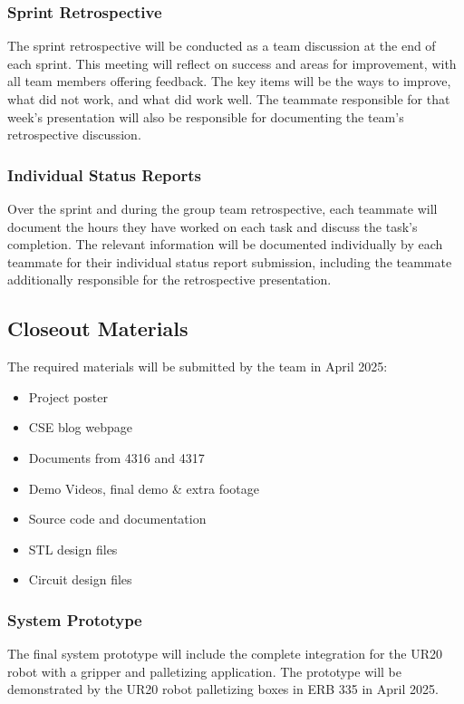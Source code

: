 \subsubsection{Sprint Retrospective}
The sprint retrospective will be conducted as a team discussion at the end of each sprint. This meeting will reflect on success and areas for improvement, with all team members offering feedback. The key items will be the ways to improve, what did not work, and what did work well. The teammate responsible for that week's presentation will also be responsible for documenting the team's retrospective discussion.

\subsubsection{Individual Status Reports}
Over the sprint and during the group team retrospective, each teammate will document the hours they have worked on each task and discuss the task's completion. The relevant information will be documented individually by each teammate for their individual status report submission, including the teammate additionally responsible for the retrospective presentation.

\subsection{Closeout Materials}
The required materials will be submitted by the team in April 2025: 
\begin{itemize}
    \item Project poster
    \item CSE blog webpage
    \item Documents from 4316 and 4317
    \item Demo Videos, final demo \& extra footage
    \item Source code and documentation
    \item STL design files
    \item Circuit design files
\end{itemize}

\subsubsection{System Prototype}
The final system prototype will include the complete integration for the UR20 robot with a gripper and palletizing application. The prototype will be demonstrated by the UR20 robot palletizing boxes in ERB 335 in April 2025.
